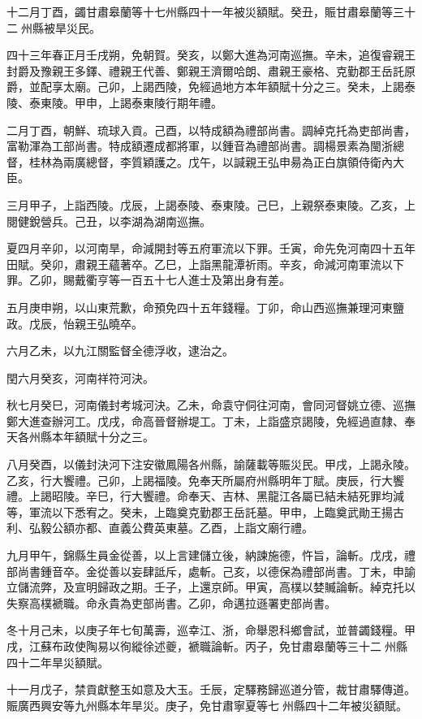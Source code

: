 \begin{pinyinscope}
十二月丁酉，蠲甘肅皋蘭等十七州縣四十一年被災額賦。癸丑，賑甘肅皋蘭等三十二州縣被旱災民。

四十三年春正月壬戌朔，免朝賀。癸亥，以鄭大進為河南巡撫。辛未，追復睿親王封爵及豫親王多鐸、禮親王代善、鄭親王濟爾哈朗、肅親王豪格、克勤郡王岳託原爵，並配享太廟。己卯，上謁西陵，免經過地方本年額賦十分之三。癸未，上謁泰陵、泰東陵。甲申，上謁泰東陵行期年禮。

二月丁酉，朝鮮、琉球入貢。己酉，以特成額為禮部尚書。調綽克托為吏部尚書，富勒渾為工部尚書。特成額遷成都將軍，以鍾音為禮部尚書。調楊景素為閩浙總督，桂林為兩廣總督，李質穎護之。戊午，以諴親王弘申昜為正白旗領侍衛內大臣。

三月甲子，上詣西陵。戊辰，上謁泰陵、泰東陵。己巳，上親祭泰東陵。乙亥，上閱健銳營兵。己丑，以李湖為湖南巡撫。

夏四月辛卯，以河南旱，命減開封等五府軍流以下罪。壬寅，命先免河南四十五年田賦。癸卯，肅親王蘊著卒。乙巳，上詣黑龍潭祈雨。辛亥，命減河南軍流以下罪。乙卯，賜戴衢亨等一百五十七人進士及第出身有差。

五月庚申朔，以山東荒歉，命預免四十五年錢糧。丁卯，命山西巡撫兼理河東鹽政。戊辰，怡親王弘曉卒。

六月乙未，以九江關監督全德浮收，逮治之。

閏六月癸亥，河南祥符河決。

秋七月癸巳，河南儀封考城河決。乙未，命袁守侗往河南，會同河督姚立德、巡撫鄭大進查辦河工。戊戌，命高晉督辦堤工。丁未，上詣盛京謁陵，免經過直隸、奉天各州縣本年額賦十分之三。

八月癸酉，以儀封決河下注安徽鳳陽各州縣，諭薩載等賑災民。甲戌，上謁永陵。乙亥，行大饗禮。己卯，上謁福陵。免奉天所屬府州縣明年丁賦。庚辰，行大饗禮。上謁昭陵。辛巳，行大饗禮。命奉天、吉林、黑龍江各屬已結未結死罪均減等，軍流以下悉宥之。癸未，上臨奠克勤郡王岳託墓。甲申，上臨奠武勛王揚古利、弘毅公額亦都、直義公費英東墓。乙酉，上詣文廟行禮。

九月甲午，錦縣生員金從善，以上言建儲立後，納諫施德，忤旨，論斬。戊戌，禮部尚書鍾音卒。金從善以妄肆詆斥，處斬。己亥，以德保為禮部尚書。丁未，申諭立儲流弊，及宣明歸政之期。壬子，上還京師。甲寅，高樸以婪贓論斬。綽克托以失察高樸褫職。命永貴為吏部尚書。乙卯，命邁拉遜署吏部尚書。

冬十月己未，以庚子年七旬萬壽，巡幸江、浙，命舉恩科鄉會試，並普蠲錢糧。甲戌，江蘇布政使陶易以徇縱徐述夔，褫職論斬。丙子，免甘肅皋蘭等三十二州縣四十二年旱災額賦。

十一月戊子，禁貢獻整玉如意及大玉。壬辰，定驛務歸巡道分管，裁甘肅驛傳道。賑廣西興安等九州縣本年旱災。庚子，免甘肅寧夏等七州縣四十二年被災額賦。


\end{pinyinscope}
